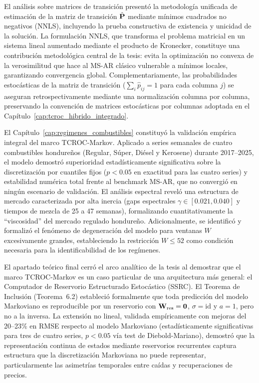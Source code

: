 El análisis sobre matrices de transición presentó la
metodología unificada de estimación de la matriz de transición
$\hat{\mathbf{P}}$ mediante mínimos cuadrados no negativos (NNLS),
incluyendo la prueba constructiva de existencia y unicidad de la
solución.  La formulación NNLS, que transforma el problema matricial
en un sistema lineal aumentado mediante el producto de Kronecker,
constituye una contribución metodológica central de la tesis: evita
la optimización no convexa de la verosimilitud que hace al MS-AR
clásico vulnerable a mínimos locales, garantizando convergencia global. Complementariamente, las probabilidades estocásticas de la matriz de transición ($\sum_i \hat{p}_{ij} = 1$ para cada columna $j$) se aseguran retrospectivamente mediante una normalización columna por columna, preservando la convención de matrices estocásticas por columnas adoptada en el Capítulo~\ref{cap:tcroc_hibrido_integrado}.

El Capítulo~\ref{cap:regimenes_combustibles} constituyó la
validación empírica integral del marco TCROC-Markov.  Aplicado a
series semanales de cuatro combustibles hondureños (Regular, Súper,
Diésel y Kerosene) durante 2017--2025, el modelo demostró
superioridad estadísticamente significativa sobre la discretización
por cuantiles fijos ($p < 0.05$ en exactitud para las cuatro series)
y estabilidad numérica total frente al benchmark MS-AR, que no
convergió en ningún escenario de validación.  El análisis espectral
reveló una estructura de mercado caracterizada por alta inercia
(gaps espectrales $\gamma \in [0.021, 0.040]$ y tiempos de mezcla de
25 a 47 semanas), formalizando cuantitativamente la ``viscosidad''
del mercado regulado hondureño.  Adicionalmente, se identificó y
formalizó el fenómeno de degeneración del modelo para ventanas $W$
excesivamente grandes, estableciendo la restricción $W \le 52$ como
condición necesaria para la identificabilidad de los regímenes.

El apartado teórico final cerró el arco analítico de la tesis
al demostrar que el marco TCROC-Markov es un caso particular de una
arquitectura más general: el Computador de Reservorio Estructurado
Estocástico (SSRC).  El Teorema de Inclusión (Teorema~6.2)
estableció formalmente que toda predicción del modelo Markoviano es
reproducible por un reservorio con $\mathbf{W}_{\text{res}} = \mathbf{0}$,
$\sigma = \text{id}$ y $a = 1$, pero no a la inversa.  La extensión
no lineal, validada empíricamente con mejoras del 20--23\% en RMSE
respecto al modelo Markoviano (estadísticamente significativas para
tres de cuatro series, $p < 0.05$ vía test de Diebold-Mariano),
demostró que la representación continua de estados mediante
reservorios recurrentes captura estructura que la discretización
Markoviana no puede representar, particularmente las asimetrías
temporales entre caídas y recuperaciones de precios.

